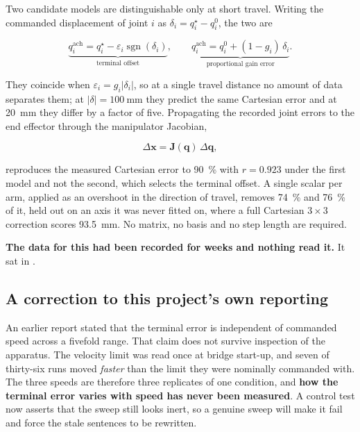 Two candidate models are distinguishable only at short travel. Writing the
commanded displacement of joint $i$ as $\delta_i = q_i^{\star} - q_i^{0}$, the
two are

\begin{equation}
  \label{eq:two-models}
  \underbrace{q_i^{\text{ach}} = q_i^{\star}
    - \varepsilon_i \operatorname{sgn}(\delta_i)}_{\text{terminal offset}},
  \qquad
  \underbrace{q_i^{\text{ach}} = q_i^{0}
    + (1 - g_i)\,\delta_i}_{\text{proportional gain error}} .
\end{equation}

They coincide when $\varepsilon_i = g_i |\delta_i|$, so at a single travel
distance no amount of data separates them; at
$|\delta| = \SI{100}{\milli\metre}$ they predict the same Cartesian error and
at \SI{20}{\milli\metre} they differ by a factor of five. Propagating the
recorded joint errors to the end effector through the manipulator Jacobian,

\begin{equation}
  \label{eq:jacobian}
  \Delta\mathbf{x} = \mathbf{J}(\mathbf{q})\,\Delta\mathbf{q},
\end{equation}

reproduces the measured Cartesian error to \SI{90}{\percent} with
$r = \num{0.923}$ under the first model and not the second, which selects the
terminal offset. A single scalar per arm,
applied as an overshoot in the direction of travel, removes \SI{74}{\percent}
and \SI{76}{\percent} of it, held out on an axis it was never fitted on, where
a full Cartesian $3\times3$ correction scores \SI{93.5}{\milli\metre}. No
matrix, no basis and no step length are required.

\textbf{The data for this had been recorded for weeks and nothing read it.}
It sat in .

\subsection{A correction to this project's own reporting}

An earlier report stated that the terminal error is independent of commanded
speed across a fivefold range. That claim does not survive inspection of the
apparatus. The velocity limit was read once at bridge start-up, and seven of
thirty-six runs moved \emph{faster} than the limit they were nominally
commanded with. The three speeds are therefore three replicates of one
condition, and \textbf{how the terminal error varies with speed has never been
measured}. A control test now asserts that the sweep still looks inert, so a
genuine sweep will make it fail and force the stale sentences to be rewritten.

